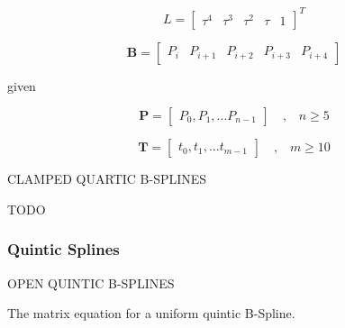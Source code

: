 \documentclass{article}
\begin{document}
    \begin{equation}
        L = \begin{bmatrix} \tau^{4} & \tau^{3} & \tau^{2} & \tau & 1 \end{bmatrix}^{T}
    \end{equation}
    
    \begin{equation}
        \textbf{B} = \begin{bmatrix} P_{i} & P_{i+1} & P_{i+2} & P_{i+3} & P_{i+4}\end{bmatrix}
    \end{equation}
    
    given
    
    \begin{equation}
    \textbf{P} = \begin{bmatrix} P_0, P_1, ... P_{n-1} \end{bmatrix} \quad \text{,} \quad n \geq 5
    \end{equation}
    
    \begin{equation}
        \textbf{T} = \begin{bmatrix} t_0, t_1, ... t_{m-1} \end{bmatrix} \quad \text{,} \quad m \geq 10
    \end{equation}
    
    
\noindent CLAMPED QUARTIC B-SPLINES
\hfill \break

    TODO
    
    \subsubsection{Quintic Splines}
    
OPEN QUINTIC B-SPLINES
\hfill \break

    The matrix equation for a uniform quintic B-Spline.
    
\end{document}
